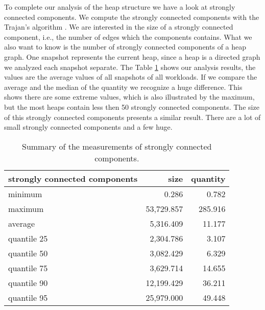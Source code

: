 To complete our analysis of the heap structure we have a look at strongly connected components. We compute the strongly connected components with the Trajan's algorithm \cite{Trajan}. We are interested in the size of a strongly connected component, i.e., the number of edges which the components contains. What we also want to know is the number of strongly connected components of a heap graph. One snapshot represents the current heap, since a heap is a directed graph we analyzed each snapshot separate. The Table \ref{tab:scc_stats} shows our analysis results, the values are the average values of all snapshots of all workloads. If we compare the average and the median of the quantity we recognize a huge difference. This shows there are some extreme values, which is also illustrated by the maximum, but the most heaps contain less then 50 strongly connected components. The size of this strongly connected components presents a similar result. There are a lot of small strongly connected components and a few huge.
\begin{table}
	\small
	\centering
	\begin{tabular}{l r r}
		\toprule
		\textbf{strongly connected components} & \textbf{size} & \textbf{quantity} \\ \midrule
		minimum							&	0.286		&	0.782			\\ 
		maximum							&	53,729.857	&	285.916			\\ 
		average							&	5,316.409	&	11.177			\\ 
		quantile 25						&	2,304.786	&	3.107			\\ 
		quantile 50						&	3,082.429	&	6.329			\\ 
		quantile 75						&	3,629.714	&	14.655			\\ 
		quantile 90						&	12,199.429	&	36.211			\\ 
		quantile 95						&	25,979.000	&	49.448			\\ \bottomrule
	\end{tabular}
	\caption{Summary of the measurements of strongly connected components.}
	\label{tab:scc_stats}
\end{table}